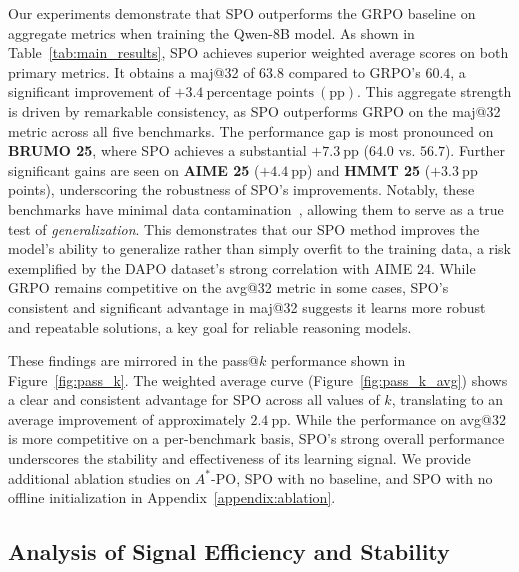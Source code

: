 Our experiments demonstrate that SPO outperforms the GRPO baseline on aggregate metrics when training the Qwen-8B model. As shown in Table~\ref{tab:main_results}, SPO achieves superior weighted average scores on both primary metrics. It obtains a maj@32 of $63.8$ compared to GRPO's $60.4$, a significant improvement of $+3.4~\text{percentage points}~(\mathrm{pp})$. This aggregate strength is driven by remarkable consistency, as SPO outperforms GRPO on the maj@32 metric across all five benchmarks. The performance gap is most pronounced on \textbf{BRUMO 25}, where SPO achieves a substantial $+7.3~\mathrm{pp}$ ($64.0$ vs. $56.7$). Further significant gains are seen on \textbf{AIME 25} ($+4.4~\mathrm{pp}$) and \textbf{HMMT 25} ($+3.3~\mathrm{pp}$ points), underscoring the robustness of SPO's improvements. Notably, these benchmarks have minimal data contamination~\citep{matharena}, allowing them to serve as a true test of \emph{generalization}. This demonstrates that our SPO method improves the model's ability to generalize rather than simply overfit to the training data, a risk exemplified by the DAPO dataset's strong correlation with AIME 24.  While GRPO remains competitive on the avg@32 metric in some cases, SPO's consistent and significant advantage in maj@32 suggests it learns more robust and repeatable solutions, a key goal for reliable reasoning models.

These findings are mirrored in the pass@$k$ performance shown in Figure~\ref{fig:pass_k}. The weighted average curve (Figure~\ref{fig:pass_k_avg}) shows a clear and consistent advantage for SPO across all values of $k$, translating to an average improvement of approximately $2.4~\mathrm{pp}$. While the performance on avg@32 is more competitive on a per-benchmark basis, SPO's strong overall performance underscores the stability and effectiveness of its learning signal. We provide additional ablation studies on $A^*$-PO, SPO with no baseline, and SPO with no offline initialization in Appendix~\ref{appendix:ablation}.








\subsection{Analysis of Signal Efficiency and Stability}

